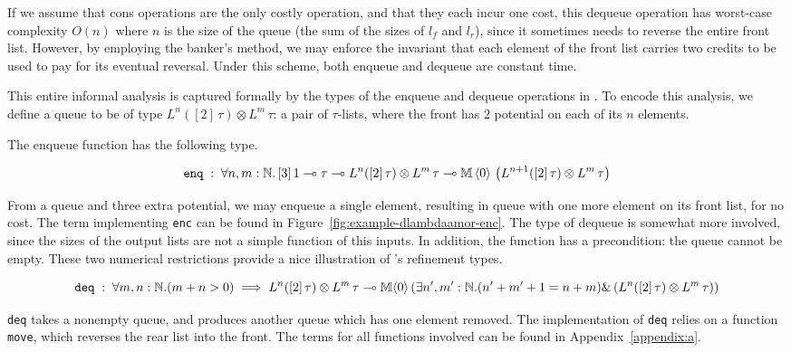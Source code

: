 If we assume that cons operations are the only costly operation, and that they each incur one cost, this dequeue operation has worst-case complexity $O(n)$ where $n$ is the size of the queue (the sum of the sizes of $l_f$ and $l_r$), since it sometimes needs to reverse the entire front list. However, by employing the banker's method, we may enforce the invariant that each element of the front list carries two credits to be used to pay for its eventual reversal. Under this scheme, both enqueue and dequeue are constant time.

This entire informal analysis is captured formally by the types of the enqueue and dequeue operations in \dlambdaamor. To encode this analysis, we define a queue to be of type $ L^n([2] \, \tau) \otimes L^m \, \tau$: a pair of $\tau$-lists, where the front has $2$ potential on each of its $n$ elements.

The enqueue function has the following type.

$$
\texttt{enq} \; : \; \forall n,m : \mathbb{N}. \, [3] \, 1 \multimap \tau \multimap L^n([2] \, \tau) \otimes L^m \, \tau \multimap \mathbb{M} \, \langle 0 \rangle \, \left(L^{n+1}([2] \, \tau) \otimes L^m \, \tau\right)
$$

From a queue and three extra potential, we may enqueue a single element, resulting in queue with one more element on its front list, for no cost. The term implementing \texttt{enc} can be found in Figure~\ref{fig:example-dlambdaamor-enc}. The type of dequeue is somewhat more involved, since the sizes of the output lists are not a simple function of this inputs. In addition, the function has a precondition: the queue cannot be empty. These two numerical restrictions provide a nice illustration of \dlambdaamor's refinement types.

$$
\texttt{deq} \; : \; \forall m,n : \mathbb{N}. (m + n > 0) \implies L^n([2] \, \tau) \otimes L^m \, \tau \multimap \mathbb{M} \langle 0 \rangle \left(\exists n',m' : \mathbb{N}. (n' + m' + 1 = n + m) \& \left(L^n([2] \, \tau) \otimes L^m \, \tau\right)\right)
$$

\texttt{deq} takes a nonempty queue, and produces another queue which has one element removed. The implementation of \texttt{deq} relies on a function \texttt{move}, which reverses the rear list into the front. The terms for all functions involved can be found in Appendix~\ref{appendix:a}.



